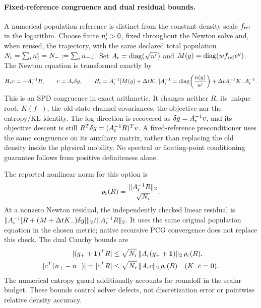 \documentclass[11pt,letterpaper]{article}
\newcommand{\diag}{\operatorname{diag}}
\begin{document}
\paragraph{Fixed-reference congruence and dual residual bounds.}
A numerical population reference is distinct from the constant density scale
$f_{\rm ref}$ in the logarithm. Choose finite $n_i^{\rm r}>0$, fixed throughout
the Newton solve and, when reused, the trajectory, with the same declared
total population $N_{\rm r}=\sum_i n_i^{\rm r}=N_-:=\sum_i n_{-,i}$.
Set $A_{\rm r}=\diag(\sqrt{n^{\rm r}})$ and
$M(g)=\diag(w f_{\rm ref}e^g)$. The Newton equation is transformed exactly by
\begin{equation}
 H_{\rm r}v=-A_{\rm r}^{-1}R,
 \qquad v=A_{\rm r}\delta g,
 \qquad H_{\rm r}=A_{\rm r}^{-1}
       [M(g)+\Delta t K_-]A_{\rm r}^{-1}
       =\diag\!\left(\frac{n(g)}{n^{\rm r}}\right)
          +\Delta t A_{\rm r}^{-1}K_-A_{\rm r}^{-1}.
 \label{eq:fixedreferencecongruence}
\end{equation}
This is an SPD congruence in exact arithmetic. It changes neither $R$, its
unique root, $K(f_-)$, the old-state channel covariances, the objective nor
the entropy/KL identity. The log direction is recovered as
$\delta g=A_{\rm r}^{-1}v$, and its objective descent is still
$R^T\delta g=(A_{\rm r}^{-1}R)^Tv$. A fixed-reference preconditioner uses the
same congruence on its auxiliary matrix, rather than replacing the old density
inside the physical mobility. No spectral or floating-point conditioning
guarantee follows from positive definiteness alone.

The reported nonlinear norm for this option is
\begin{equation}
 \rho_{\rm r}(R)=\frac{\|A_{\rm r}^{-1}R\|_2}{\sqrt{N_{\rm r}}}.
 \label{eq:fixedreferenceresidual}
\end{equation}
At a nonzero Newton residual, the independently checked linear residual
is $\|A_{\rm r}^{-1}[R+(M+\Delta t K_-)\delta g]\|_2/
\|A_{\rm r}^{-1}R\|_2$. It uses the same original population equation in
the chosen metric; native recursive PCG convergence does not replace this
check. The dual Cauchy bounds are
\begin{align}
 |(g_++\bm1)^TR|&\le
   \sqrt{N_{\rm r}}\,\|A_{\rm r}(g_++\bm1)\|_2\,\rho_{\rm r}(R),\label{eq:fixedreferenceentropybound}\\
 |c^T(n_+-n_-)|=|c^TR|&\le
   \sqrt{N_{\rm r}}\,\|A_{\rm r}c\|_2\,\rho_{\rm r}(R)
   \quad (K_-c=0).\label{eq:fixedreferenceinvariantbound}
\end{align}
The numerical entropy guard additionally accounts for roundoff in the scalar
budget. These bounds control solver defects, not discretization error or
pointwise relative density accuracy.
\end{document}

